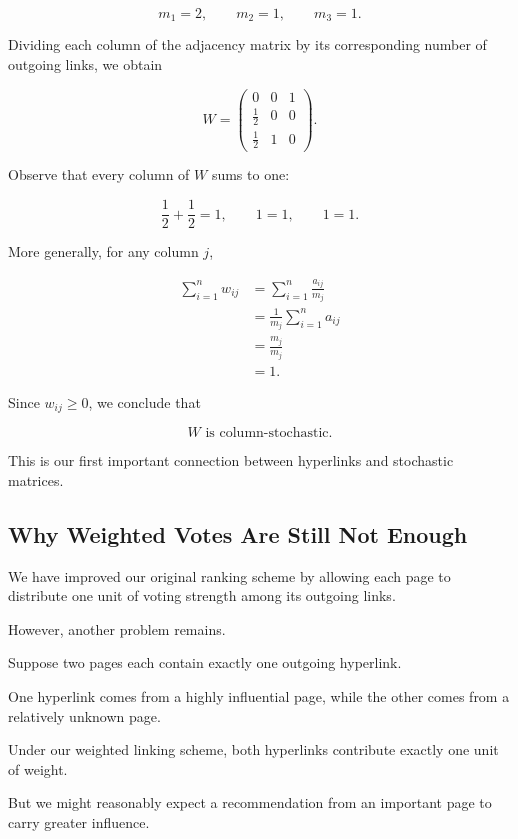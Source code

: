 \documentclass[11pt,a4paper]{article}
\theoremstyle{definition}
\theoremstyle{remark}
\begin{document}
\[
m_1=2,
\qquad
m_2=1,
\qquad
m_3=1.
\]

Dividing each column of
the adjacency matrix
by its corresponding
number of outgoing links,
we obtain

\begin{equation}
\boxed{
W=
\begin{pmatrix}
0&0&1\\[1mm]
\frac12&0&0\\[1mm]
\frac12&1&0
\end{pmatrix}.
}
\label{eq:pagerank_weighted_example}
\end{equation}

Observe that every column
of $W$ sums to one:

\[
\frac12+\frac12=1,
\qquad
1=1,
\qquad
1=1.
\]

More generally, for any
column $j$,

\[
\begin{aligned}
\sum_{i=1}^{n}w_{ij}
&=
\sum_{i=1}^{n}\frac{a_{ij}}{m_j}\\
&=
\frac{1}{m_j}
\sum_{i=1}^{n}a_{ij}\\
&=
\frac{m_j}{m_j}\\
&=1.
\end{aligned}
\]

Since $w_{ij}\geq0$,
we conclude that

\[
\boxed{W\text{ is column-stochastic}.}
\]

This is our first important
connection between hyperlinks
and stochastic matrices.


\subsection{Why Weighted Votes Are Still Not Enough}

We have improved our original
ranking scheme by allowing
each page to distribute
one unit of voting strength
among its outgoing links.

However, another problem remains.

Suppose two pages each
contain exactly one
outgoing hyperlink.

One hyperlink comes from
a highly influential page,
while the other comes from
a relatively unknown page.

Under our weighted
linking scheme,
both hyperlinks contribute
exactly one unit of weight.

But we might reasonably
expect a recommendation
from an important page
to carry greater influence.
\end{document}
